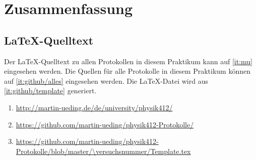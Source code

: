 
\FloatBarrier
\section{Zusammenfassung}

\fehlt


\FloatBarrier
\begin{appendix}
    \FloatBarrier
    \section{\LaTeX-Quelltext}

    Der \LaTeX-Quelltext zu allen Protokollen in diesem Praktikum kann auf
    \ref{it:mu} eingesehen werden. Die Quellen für alle Protokolle in diesem
    Praktikum können auf \ref{it:github/alles} eingesehen werden. Die
    \LaTeX-Datei wird aus \ref{it:github/template} generiert.

    \begin{enumerate}
        \item
            \label{it:mu}
            \url{http://martin-ueding.de/de/university/physik412/}
        \item
            \label{it:github/alles}
            \url{https://github.com/martin-ueding/physik412-Protokolle/}
        \item
            \label{it:github/template}
            \url{https://github.com/martin-ueding/physik412-Protokolle/blob/master/\versuchsnummer/Template.tex}
    \end{enumerate}
\end{appendix}


\FloatBarrier
\printbibliography



